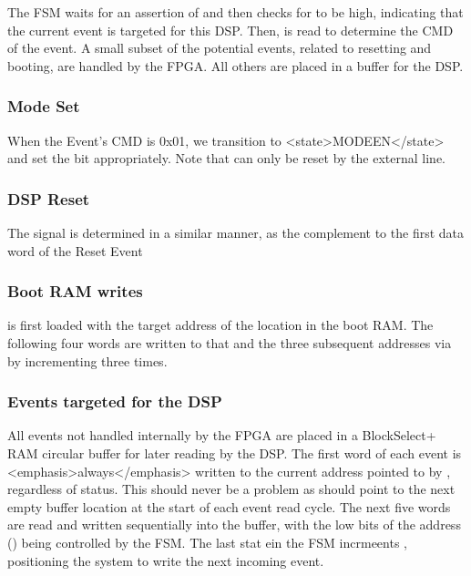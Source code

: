 {The FSM waits for an assertion of  and then
checks for  to be high, indicating that the
current event is targeted for this DSP. Then,
 is read to determine the CMD of the event.
A small subset of the potential events, related to resetting and
booting, are handled by the FPGA. All others are placed in a buffer
for the DSP.

\subsubsection{Mode Set}

When the Event's CMD is 0x01, we transition to <state>MODEEN</state>
and set the  bit appropriately. Note that
 can only be reset by the external
 line.

      
\subsubsection{DSP Reset}

The  signal is determined in a similar
manner, as the complement to the first data word of the Reset Event


\subsubsection{Boot RAM writes}


 is first loaded with the target address
of the location in the boot RAM. The following four words are written
to that and the three subsequent addresses via
 by incrementing
 three times.


\subsubsection{Events targeted for the DSP}

All events not handled internally by the FPGA are placed in a
BlockSelect+ RAM circular buffer for later reading by the DSP. The
first word of each event is <emphasis>always</emphasis> written to the
current address pointed to by , regardless
of  status. This should never be a problem as
 should point to the next empty buffer
location at the start of each event read cycle. The next five words
are read and written sequentially into the buffer, with the low bits
of the address () being controlled by the
FSM. The last stat ein the FSM incrmeents ,
positioning the system to write the next incoming event.

}
